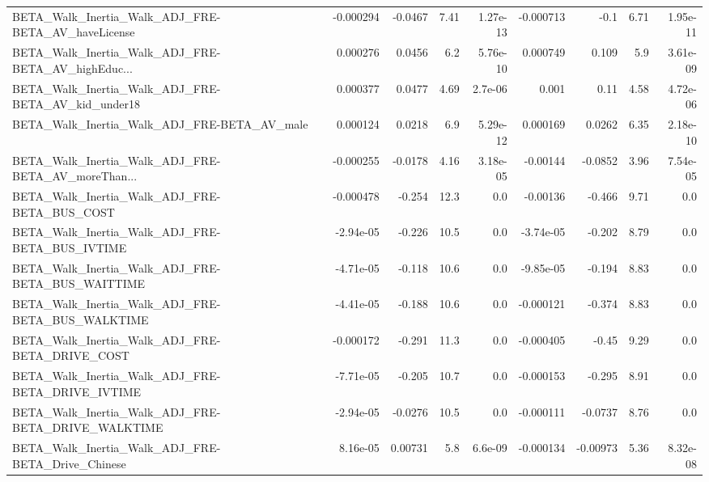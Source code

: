 \begin{tabular}{lrrrrrrrr}
BETA\_Walk\_Inertia\_Walk\_ADJ\_FRE-BETA\_AV\_haveLicense &   -0.000294 &      -0.0467 &     7.41 & 1.27e-13 &  -0.000713 &        -0.1 &         6.71 &      1.95e-11 \\
BETA\_Walk\_Inertia\_Walk\_ADJ\_FRE-BETA\_AV\_highEduc... &    0.000276 &       0.0456 &      6.2 & 5.76e-10 &   0.000749 &       0.109 &          5.9 &      3.61e-09 \\
BETA\_Walk\_Inertia\_Walk\_ADJ\_FRE-BETA\_AV\_kid\_under18 &    0.000377 &       0.0477 &     4.69 &  2.7e-06 &      0.001 &        0.11 &         4.58 &      4.72e-06 \\
BETA\_Walk\_Inertia\_Walk\_ADJ\_FRE-BETA\_AV\_male        &    0.000124 &       0.0218 &      6.9 & 5.29e-12 &   0.000169 &      0.0262 &         6.35 &      2.18e-10 \\
BETA\_Walk\_Inertia\_Walk\_ADJ\_FRE-BETA\_AV\_moreThan... &   -0.000255 &      -0.0178 &     4.16 & 3.18e-05 &   -0.00144 &     -0.0852 &         3.96 &      7.54e-05 \\
BETA\_Walk\_Inertia\_Walk\_ADJ\_FRE-BETA\_BUS\_COST       &   -0.000478 &       -0.254 &     12.3 &      0.0 &   -0.00136 &      -0.466 &         9.71 &           0.0 \\
BETA\_Walk\_Inertia\_Walk\_ADJ\_FRE-BETA\_BUS\_IVTIME     &   -2.94e-05 &       -0.226 &     10.5 &      0.0 &  -3.74e-05 &      -0.202 &         8.79 &           0.0 \\
BETA\_Walk\_Inertia\_Walk\_ADJ\_FRE-BETA\_BUS\_WAITTIME   &   -4.71e-05 &       -0.118 &     10.6 &      0.0 &  -9.85e-05 &      -0.194 &         8.83 &           0.0 \\
BETA\_Walk\_Inertia\_Walk\_ADJ\_FRE-BETA\_BUS\_WALKTIME   &   -4.41e-05 &       -0.188 &     10.6 &      0.0 &  -0.000121 &      -0.374 &         8.83 &           0.0 \\
BETA\_Walk\_Inertia\_Walk\_ADJ\_FRE-BETA\_DRIVE\_COST     &   -0.000172 &       -0.291 &     11.3 &      0.0 &  -0.000405 &       -0.45 &         9.29 &           0.0 \\
BETA\_Walk\_Inertia\_Walk\_ADJ\_FRE-BETA\_DRIVE\_IVTIME   &   -7.71e-05 &       -0.205 &     10.7 &      0.0 &  -0.000153 &      -0.295 &         8.91 &           0.0 \\
BETA\_Walk\_Inertia\_Walk\_ADJ\_FRE-BETA\_DRIVE\_WALKTIME &   -2.94e-05 &      -0.0276 &     10.5 &      0.0 &  -0.000111 &     -0.0737 &         8.76 &           0.0 \\
BETA\_Walk\_Inertia\_Walk\_ADJ\_FRE-BETA\_Drive\_Chinese  &    8.16e-05 &      0.00731 &      5.8 &  6.6e-09 &  -0.000134 &    -0.00973 &         5.36 &      8.32e-08 \\

\end{tabular}
